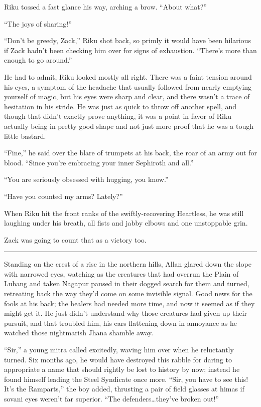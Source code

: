 Riku tossed a fast glance his way, arching a brow. ``About what?''

``The joys of sharing!''

``Don't be greedy, Zack,'' Riku shot back, so primly it would have been hilarious if Zack hadn't been checking him over for signs of exhaustion. ``There's more than enough to go around.''

He had to admit, Riku looked mostly all right. There was a faint tension around his eyes, a symptom of the headache that usually followed from nearly emptying yourself of magic, but his eyes were sharp and clear, and there wasn't a trace of hesitation in his stride. He was just as quick to throw off another spell, and though that didn't exactly prove anything, it was a point in favor of Riku actually being in pretty good shape and not just more proof that he was a tough little bastard.

``Fine,'' he said over the blare of trumpets at his back, the roar of an army out for blood. ``Since you're embracing your inner Sephiroth and all.''

``You are seriously obsessed with hugging, you know.''

``Have you counted my arms? Lately?''

When Riku hit the front ranks of the swiftly-recovering Heartless, he was still laughing under his breath, all fists and jabby elbows and one unstoppable grin.

Zack was going to count that as a victory too.

\fancybreak{\pfbreakdisplay}


Standing on the crest of a rise in the northern hills, Allan glared down the slope with narrowed eyes, watching as the creatures that had overrun the Plain of Luhang and taken Nagapur paused in their dogged search for them and turned, retreating back the way they'd come on some invisible signal. Good news for the fools at his back; the healers had needed more time, and now it seemed as if they might get it. He just didn't understand why those creatures had given up their pursuit, and that troubled him, his ears flattening down in annoyance as he watched those nightmarish Jhana shamble away.

``Sir,'' a young mitra called excitedly, waving him over when he reluctantly turned. Six months ago, he would have destroyed this rabble for daring to appropriate a name that should rightly be lost to history by now; instead he found himself leading the Steel Syndicate once more. ``Sir, you have to see this! It's the Ramparts,'' the boy added, thrusting a pair of field glasses at him\textemdash as if sovani eyes weren't far superior. ``The defenders\ldots they've broken out!''

